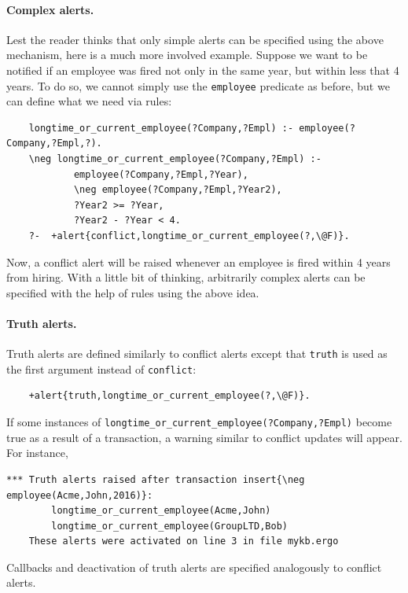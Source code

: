 \paragraph{Complex alerts.} Lest the reader thinks that only simple
alerts can be specified using the above mechanism, here is a much more
involved example. Suppose we want to be notified if an employee 
was fired not only in the same year, but within less that 4 years. To do so, we
cannot simply use the \texttt{employee} 
predicate as before, but we can define what
we need via rules:
\begin{verbatim}
    longtime_or_current_employee(?Company,?Empl) :- employee(?Company,?Empl,?).
    \neg longtime_or_current_employee(?Company,?Empl) :-
            employee(?Company,?Empl,?Year),
            \neg employee(?Company,?Empl,?Year2),
            ?Year2 >= ?Year,
            ?Year2 - ?Year < 4.
    ?-  +alert{conflict,longtime_or_current_employee(?,\@F)}.
\end{verbatim}
Now, a conflict alert will be raised whenever an employee is fired within
4 years from hiring.  With a little bit of thinking, arbitrarily complex
alerts can be specified with the help of rules using the above idea.

\paragraph{Truth alerts.}
Truth alerts are defined similarly to conflict alerts except that
\texttt{truth} is used as the first argument instead of \texttt{conflict}:
\begin{verbatim}
    +alert{truth,longtime_or_current_employee(?,\@F)}.
\end{verbatim}
If some instances of \texttt{longtime\_or\_current\_employee(?Company,?Empl)} 
become true as a result of a transaction, a warning similar to conflict
updates will appear. For instance,
\begin{verbatim}
*** Truth alerts raised after transaction insert{\neg employee(Acme,John,2016)}:
        longtime_or_current_employee(Acme,John)
        longtime_or_current_employee(GroupLTD,Bob)
    These alerts were activated on line 3 in file mykb.ergo
\end{verbatim}
Callbacks and deactivation of truth alerts are specified
analogously to conflict alerts.


